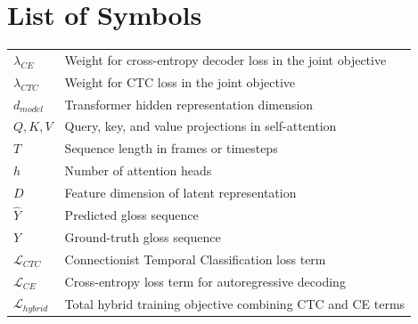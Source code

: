 \section*{List of Symbols}
\begin{tabularx}{\textwidth}{@{}p{}X@{}}
\textbf{$\lambda_{CE}$} & Weight for cross-entropy decoder loss in the joint objective \\
\textbf{$\lambda_{CTC}$} & Weight for CTC loss in the joint objective \\
\textbf{$d_{model}$} & Transformer hidden representation dimension \\
\textbf{$Q, K, V$} & Query, key, and value projections in self-attention \\
\textbf{$T$} & Sequence length in frames or timesteps \\
\textbf{$h$} & Number of attention heads \\
\textbf{$D$} & Feature dimension of latent representation \\
\textbf{$\hat{Y}$} & Predicted gloss sequence \\
\textbf{$Y$} & Ground-truth gloss sequence \\
\textbf{$\mathcal{L}_{CTC}$} & Connectionist Temporal Classification loss term \\
\textbf{$\mathcal{L}_{CE}$} & Cross-entropy loss term for autoregressive decoding \\
\textbf{$\mathcal{L}_{hybrid}$} & Total hybrid training objective combining CTC and CE terms \\
\end{tabularx}
